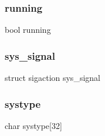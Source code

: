 \subsubsection{running}
{\footnotesize\ttfamily bool running}

\mbox{\label{sys_8h_a0c47ee9a971ae64fdb6e67c95ed3c842}} 
\subsubsection{sys\+\_\+signal}
{\footnotesize\ttfamily struct sigaction sys\+\_\+signal}

\mbox{\label{sys_8h_a0c655eafbc29c3302d2fe8153a831076}} 
\subsubsection{systype}
{\footnotesize\ttfamily char systype[32]}

